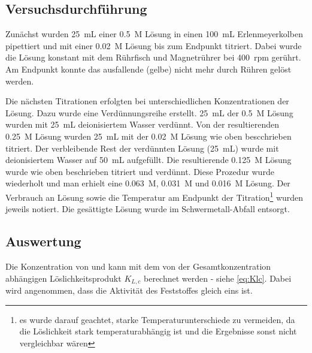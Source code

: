 \documentclass{article}
\begin{document}
    \subsection{Versuchsdurchführung}  \label{sec:Versuch}
    
      Zunächst wurden \SI[mode=text]{25}{\milli\liter} einer \SI[mode=text]{0.5}{M}  Lösung in einen \SI[mode=text]{100}{\milli\liter} Erlenmeyerkolben pipettiert und mit einer \SI[mode=text]{0.02}{M}  Lösung bis zum Endpunkt titriert. Dabei wurde die Lösung konstant mit dem Rührfisch und Magnetrührer bei \SI[mode=text]{400}{rpm} gerührt. Am Endpunkt konnte das ausfallende  (gelbe) nicht mehr durch Rühren gelöst werden.
      
      Die nächsten Titrationen erfolgten bei unterschiedlichen Konzentrationen der  Lösung. Dazu wurde eine Verdünnungsreihe erstellt. \SI[mode=text]{25}{\milli\liter} der \SI[mode=text]{0.5}{M}  Lösung wurden mit \SI[mode=text]{25}{\milli\liter} deionisiertem Wasser verdünnt. Von der resultierenden \SI[mode=text]{0.25}{M}  Lösung wurden \SI[mode=text]{25}{\milli\liter} mit der \SI[mode=text]{0.02}{M}  Lösung wie oben bescchrieben titriert. Der verbleibende Rest der verdünnten Lösung (\SI[mode=text]{25}{\milli\liter}) wurde mit deionisiertem Wasser auf \SI[mode=text]{50}{\milli\liter} aufgefüllt. Die resultierende \SI[mode=text]{0.125}{M}  Lösung wurde wie oben beschrieben titriert und verdünnt. Diese Prozedur wurde wiederholt und man erhielt eine \SI[mode=text]{0.063}{M}, \SI[mode=text]{0.031}{M} und \SI[mode=text]{0.016}{M}  Lösung. Der Verbrauch an  Lösung sowie die Temperatur am Endpunkt der Titration\footnote{es wurde darauf geachtet, starke Temperaturunterschiede zu vermeiden, da die Löslichkeit stark temperaturabhängig ist und die Ergebnisse sonst nicht vergleichbar wären} wurden jeweils notiert. Die gesättigte  Lösung wurde im Schwermetall-Abfall entsorgt.
    
     
    \subsection{Auswertung} \label{sec:Auswertung}
      
      Die Konzentration von  und  kann mit dem von der Gesamtkonzentration abhängigen Löslichkeitsprodukt $K_{L,c}$ berechnet werden - siehe \eqref{eq:Klc}. Dabei wird angenommen, dass die Aktivität des Feststoffes  gleich eins ist. \\
      
\end{document}
